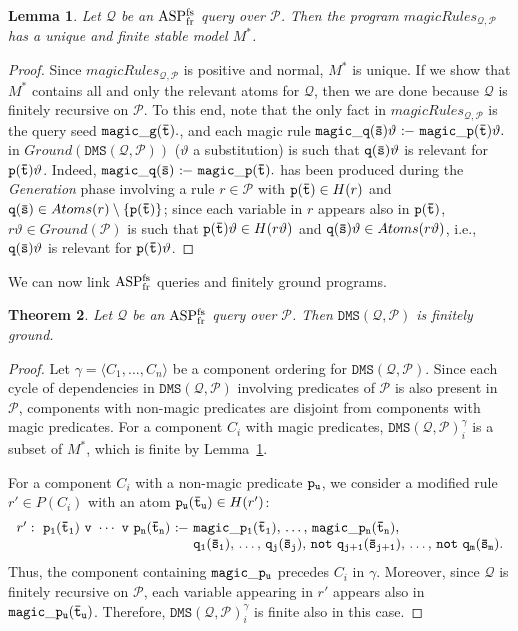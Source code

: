 \documentclass{tlp}
\newcommand{\Or}{\ensuremath{\mathtt{\,v\,}}\xspace}
\newcommand{\derives}{\ensuremath{\mathtt{\ :\!\!-}\ }}
\newcommand{\p}{\ensuremath{{\mathcal{P}}}}
\newcommand{\R}{\ensuremath{r}}
\newcommand{\HR}{\ensuremath{H(\R)}}
\newcommand{\naf}{\ensuremath{\mathtt{not}}\xspace}
\newcommand{\ground}[1]{\ensuremath{Ground(#1)}}
\newcommand{\head}[1]{\ensuremath{H(#1)}}
\newcommand{\atoms}[1]{\ensuremath{Atoms(#1)}}
\newenvironment{dlvcode}
  {\begin{displaymath}\begin{array}{l}}
  {\end{array}\end{displaymath}}
\newtheorem{theorem}{Theorem}[section]
\newtheorem{lemma}[theorem]{Lemma}
\newcommand{\Q}{\mathcal{Q}}
\newcommand{\magicRules}{\ensuremath{\mathit{magicRules}}}
\newcommand{\dmsqp}{\ensuremath{\DMS(\Q,\p)}}
\newcommand{\magica}{*}
\newcommand{\DMS}{\ensuremath{\mathtt{DMS}}}
\renewcommand{\t}{\bar t}
\newcommand{\s}{\bar s}
\newcommand{\ASPFNFR}{\ensuremath{\rm ASP^{\rm fs}_{\rm fr}}}
\begin{document}
\begin{lemma}\label{lem:magicUnique}
Let $\Q$ be an \ASPFNFR{} query over $\p$.
Then the program \magicRules$_{\Q,\p}$ has a unique and finite stable model $M^\magica$.
\end{lemma}
\begin{proof}
Since \magicRules$_{\Q,\p}$ is positive and normal, $M^\magica$ is unique.
If we show that $M^\magica$ contains all and only the relevant atoms for $\Q$,
then we are done because $\Q$ is finitely recursive on $\p$.
To this end, note that the only fact in \magicRules$_{\Q,\p}$ is the query seed
$\tt magic\_g(\t).$, and each magic rule $\tt magic\_q(\s)\vartheta \derives magic\_p(\t)\vartheta.$
in $\ground{\dmsqp}$ ($\vartheta$ a substitution) is such that
${\tt q(\s)}\vartheta$ is relevant for ${\tt p(\t)}\vartheta$.
Indeed, $\tt magic\_q(\s) \derives magic\_p(\t).$ has been produced during the 
{\em Generation} phase involving a rule $\R \in \p$ with ${\tt p(\t)} \in \HR$ 
and ${\tt q(\s)} \in \atoms{\R} \setminus \{{\tt p(\t)}\}$;
since each variable in $\R$ appears also in $\tt p(\t)$,
$\R\vartheta \in \ground{\p}$ is such that ${\tt p(\t)}\vartheta \in \head{\R\vartheta}$ and
${\tt q(\s)}\vartheta \in \atoms{\R\vartheta}$, i.e., ${\tt q(\s)}\vartheta$
is relevant for ${\tt p(\t)}\vartheta$.
\end{proof}


We can now link \ASPFNFR{} queries and finitely ground programs.

\begin{theorem}\label{theo:magicFinitelyGround}
Let $\Q$ be an \ASPFNFR{} query over $\p$.
Then $\DMS(\Q,\p)$ is finitely ground.
\end{theorem}
\begin{proof}
Let $\gamma = \langle C_1, \ldots, C_n \rangle$ be a component ordering for
$\dmsqp$.
Since each cycle of dependencies in $\dmsqp$ involving predicates of $\p$
is also present in $\p$, components with
non-magic predicates are disjoint from components with magic predicates.
For a component $C_i$ with magic predicates, 
$\dmsqp_i^\gamma$ is a subset of $M^\magica$,
which is finite by Lemma~\ref{lem:magicUnique}.

For a component $C_i$ with a non-magic predicate $\tt p_u$, we consider
a modified rule $\R' \in P(C_i)$ with an atom ${\tt p_u(\t_u)} \in \head{\R'}$:
\begin{dlvcode}
\R': \ \tt p_1(\t_1)\,\Or\,\cdots\,\Or\,p_n(\t_n) \derives 
     magic\_p_1(\t_1),\,\ldots,\,magic\_p_n(\t_n),\\
\phantom{\R': \ \tt p_1(\t_1)\,\Or\,\cdots\,\Or\,p_n(\t_n) \derives }
     \tt q_1(\s_1),\,\ldots,\,q_j(\s_j),\,\naf~q_{j+1}(\s_{j+1}),\,\ldots,\,\naf~q_m(\s_m).
\end{dlvcode}Thus, the component containing $\tt magic\_p_u$ precedes $C_i$ in $\gamma$.
Moreover, since $\Q$ is finitely recursive on $\p$, each variable appearing in
$\R'$ appears also in $\tt magic\_p_u(\t_u)$.
Therefore, $\dmsqp_i^\gamma$ is finite also in this case.
\end{proof}
\end{document}
